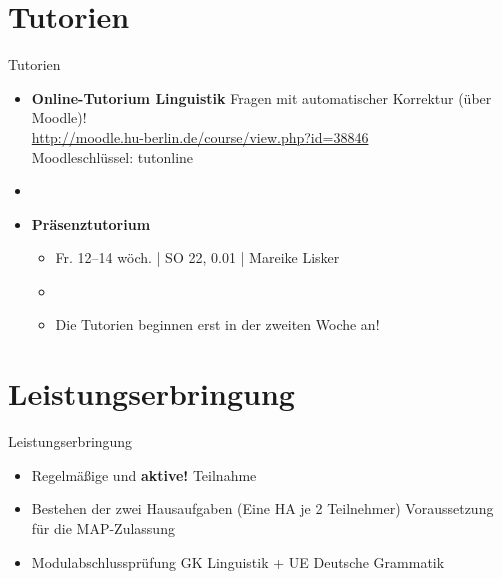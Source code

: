 %
\section{Tutorien}

\begin{frame}{Tutorien}

	\begin{itemize}
		\item \textbf{Online-Tutorium Linguistik} \ras Fragen mit automatischer Korrektur (über Moodle)!\\
		\url{http://moodle.hu-berlin.de/course/view.php?id=38846}\\
		Moodleschlüssel: tutonline
		\item[]
		\item \textbf{Präsenztutorium}
		
		\begin{itemize}
			\item Fr. 12--14 wöch. | SO 22, 0.01 | Mareike Lisker
			\item[]
			\item Die Tutorien beginnen erst in der zweiten Woche an!
		\end{itemize}
		
	\end{itemize}
	
\end{frame}


%
\section{Leistungserbringung}

\begin{frame}{Leistungserbringung}

	\begin{itemize}
		\item Regelmäßige und \textbf{aktive!} Teilnahme
		\item Bestehen der zwei Hausaufgaben (Eine HA je 2 Teilnehmer) \ras Voraussetzung für die MAP-Zulassung
		\item Modulabschlussprüfung \ras GK Linguistik + UE Deutsche Grammatik
	\end{itemize}
	
\end{frame}


